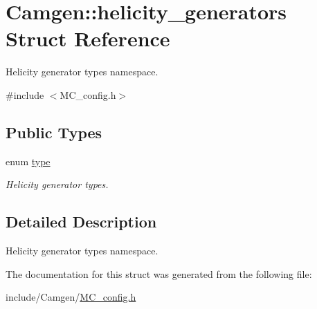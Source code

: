 \hypertarget{a00270}{\section{Camgen\-:\-:helicity\-\_\-generators Struct Reference}
\label{a00270}
}


Helicity generator types namespace.  




{\ttfamily \#include $<$M\-C\-\_\-config.\-h$>$}

\subsection*{Public Types}
\begin{DoxyCompactItemize}
\item 
enum \hyperlink{a00270_a8481232150a01996d5ca4035ea902c31}{type} 
\begin{DoxyCompactList}\small\item\em Helicity generator types. \end{DoxyCompactList}\end{DoxyCompactItemize}


\subsection{Detailed Description}
Helicity generator types namespace. 

The documentation for this struct was generated from the following file\-:\begin{DoxyCompactItemize}
\item 
include/\-Camgen/\hyperlink{a00670}{M\-C\-\_\-config.\-h}\end{DoxyCompactItemize}

